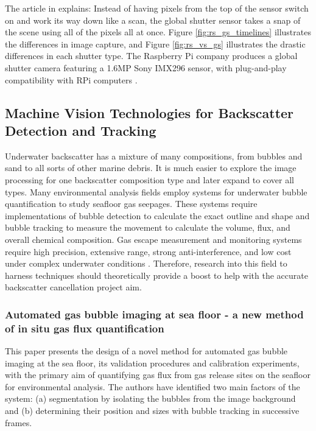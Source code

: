 The article in \cite{updatedWhatGlobalShutter2021} explains: Instead of having pixels from the top of the sensor switch on and work its way down like a scan, the global shutter sensor takes a snap of the scene using all of the pixels all at once. Figure \ref{fig:rs_gs_timelines} illustrates the differences in image capture, and Figure \ref{fig:rs_vs_gs} illustrates the drastic differences in each shutter type. The Raspberry Pi company produces a global shutter camera featuring a 1.6MP Sony IMX296 sensor, with plug-and-play compatibility with RPi computers \cite{raspberrypiltdBuyRaspberryPib}.

\subsection{Machine Vision Technologies for Backscatter Detection and Tracking}
Underwater backscatter has a mixture of many compositions, from bubbles and sand to all sorts of other marine debris. It is much easier to explore the image processing for one backscatter composition type and later expand to cover all types. Many environmental analysis fields employ systems for underwater bubble quantification to study seafloor gas seepages. These systems require implementations of bubble detection to calculate the exact outline and shape and bubble tracking to measure the movement to calculate the volume, flux, and overall chemical composition. Gas escape measurement and monitoring systems require high precision, extensive range, strong anti-interference, and low cost under complex underwater conditions \cite{zhangUnderwaterBubbleEscape2023}. Therefore, research into this field to harness techniques should theoretically provide a boost to help with the accurate backscatter cancellation project aim.

\subsubsection{Automated gas bubble imaging at sea floor - a new method of in situ gas flux quantification \cite{thomanekAutomatedGasBubble2010}}
This paper presents the design of a novel method for automated gas bubble imaging at the sea floor, its validation procedures and calibration experiments, with the primary aim of quantifying gas flux from gas release sites on the seafloor for environmental analysis. The authors have identified two main factors of the system: (a) segmentation by isolating the bubbles from the image background and (b) determining their position and sizes with bubble tracking in successive frames.


